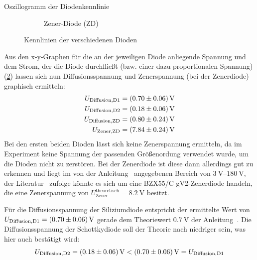 \documentclass{article}
\theoremstyle{definition}
\begin{document}
\begin{aufgabe}{Oszillogramm der Diodenkennlinie}
\begin{figure}[H]
\begin{subfigure}[b]{0.45 \textwidth}
            \caption{Zener-Diode (ZD)}
            \label{a2_2}
        \end{subfigure}
        \caption{Kennlinien der verschiedenen Dioden}
        \label{a2}
    \end{figure}
    \auswertung
    Aus den x-y-Graphen für die an der jeweiligen Diode anliegende Spannung und dem Strom, der die Diode durchfließt (bzw. einer dazu proportionalen Spannung)(\ref{a2}) lassen sich nun Diffusionsspannung und Zenerspannung (bei der Zenerdiode) graphisch ermitteln:
    \begin{align*}
        U_\mathrm{Diffusion, D1} &= \SI{0.7 +- 0.06}{\volt} \\
        U_\mathrm{Diffusion, D2} &= \SI{0.18 +- 0.06}{\volt} \\
        U_\mathrm{Diffusion, ZD} &= \SI{0.8 +- 0.24}{\volt} \\
        U_\mathrm{Zener, ZD} &= \SI{7.84 +- 0.24}{\volt} \\
    \end{align*}
    Bei den ersten beiden Dioden lässt sich keine Zenerspannung ermitteln, da im Experiment keine Spannung der passenden Größenordung verwendet wurde, um die Dioden nicht zu zerstören. Bei der Zenerdiode ist diese dann allerdings gut zu erkennen und liegt im von der Anleitung~\cite{anleitung} angegebenen Bereich von $\SIrange{3}{180}{\volt}$, der Literatur~\cite{zenerspannungen} zufolge könnte es sich um eine BZX55/C  gV2-Zenerdiode handeln, die eine Zenerspannung von $U_\mathrm{Zener}^\mathrm{theoretisch} = \SI{8.2}{\volt}$ besitzt.

    Für die Diffusionsspannung der Siliziumdiode entspricht der ermittelte Wert von $U_\mathrm{Diffusion, D1} = \SI{0.7 +- 0.06}{\volt}$ gerade dem Theoriewert $\SI{0.7}{\volt}$ der Anleitung~\cite{anleitung}. Die Diffusionsspannung der Schottkydiode soll der Theorie nach niedriger sein, was hier auch bestätigt wird: 
    \begin{equation*}
        U_\mathrm{Diffusion, D2} = \SI{0.18 +- 0.06}{\volt} < \SI{0.7 +- 0.06}{\volt} = U_\mathrm{Diffusion, D1}
    \end{equation*}
    
\end{aufgabe}
\clearpage
\end{document}
